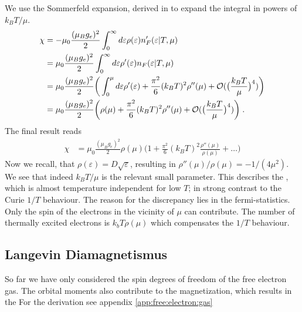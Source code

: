 We use the Sommerfeld expansion, derived in  to expand the integral in powers of $k_{B}T/\mu$. 
%
\begin{align*}
\chi &=-\mu_{0}\frac{(\mu_{B}g_{e})^{2} }{2}  \int_{0}^{\infty}d\varepsilon \rho(\varepsilon)  n'_{F}(\varepsilon|T,\mu)\notag\\
&=\mu_{0}\frac{(\mu_{B}g_{e})^{2} }{2}  \int_{0}^{\infty}d\varepsilon \rho'(\varepsilon)  n_{F}(\varepsilon|T,\mu)\\
 &=\mu_{0}\frac{(\mu_{B}g_{e})^{2} }{2}  \bigg(\int_{0}^{\mu}d\varepsilon \rho'(\varepsilon)
+\frac{\pi^{2}}{6}(k_{B}T)^{2}\rho''(\mu)+ {\cal O}(\big(\frac{k_{B}T}{\mu}\big)^{4})
 \bigg)\\    
  &=\mu_{0}\frac{(\mu_{B}g_{e})^{2} }{2}  \bigg( \rho(\mu)
+\frac{\pi^{2}}{6}(k_{B}T)^{2}\rho''(\mu)+ {\cal O}(\big(\frac{k_{B}T}{\mu}\big)^{4})
 \bigg)\;.
\end{align*}
%
The final result reads
%
\begin{align}\label{eq:para:chi}
\chi   &=\mu_{0}\frac{(\mu_{B}g_{e})^{2} }{2}  \rho(\mu)\bigg( 1
+\frac{\pi^{2}}{6}(k_{B}T)^{2}\frac{\rho''(\mu)}{\rho(\mu)}+\ldots
 \bigg)
\end{align}
%
Now we recall, that $\rho(\varepsilon) = D \sqrt{\varepsilon}$, resulting in
$\rho''(\mu)/\rho(\mu)=-1/(4\mu^{2})$. 
%
%
We see that indeed $k_{B}T/\mu$ is the relevant small parameter.
This describes the , which is almost temperature
independent for low $T$; in strong contrast to the Curie $1/T$ behaviour.
The reason for the discrepancy lies in the fermi-statistics. Only the spin of the electrons in the vicinity of $\mu$ can contribute. The number of thermally excited electrons
is $k_{b} T \rho(\mu)$ which compensates the $1/T$ behaviour.


\subsection{Langevin Diamagnetismus}
So far we have only considered the spin degrees of freedom of the free electron gas. The orbital moments also contribute to the magnetization, which results in the
For the derivation see appendix \ref{app:free:electron:gas}

